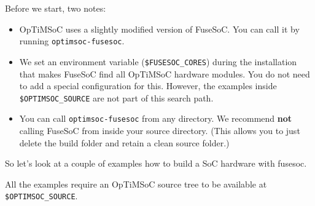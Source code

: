 Before we start, two notes:
\begin{itemize}
 \item OpTiMSoC uses a slightly modified version of FuseSoC. You can call it by running \verb|optimsoc-fusesoc|.
 \item We set an environment variable (\verb|$FUSESOC_CORES|) during the installation that makes FuseSoC find all OpTiMSoC hardware modules. You do not need to add a special configuration for this. However, the examples inside \verb|$OPTIMSOC_SOURCE| are not part of this search path.
 \item You can call \verb|optimsoc-fusesoc| from any directory. We recommend \textbf{not} calling FuseSoC from inside your source directory. (This allows you to just delete the build folder and retain a clean source folder.)
\end{itemize}

So let's look at a couple of examples how to build a SoC hardware with fusesoc.

\begin{docnote}
All the examples require an OpTiMSoC source tree to be available at \verb|$OPTIMSOC_SOURCE|.
\end{docnote}


